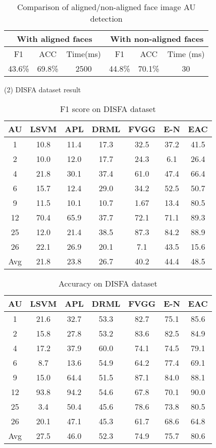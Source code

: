 \documentclass[a4paper, 10pt, conference]{ieeeconf}      %
\begin{document}
\begin{table}
\caption{Comparison of aligned/non-aligned face image AU detection}
\label{tab5}
\begin{center}

\begin{tabular}{|c|c|c|c|c|c|}
\hline
\multicolumn{3}{|c|}{With aligned faces}&\multicolumn{3}{|c|}{With non-aligned faces}\\
\hline
F1&ACC&Time(ms)&F1&ACC&Time (ms)\\
\hline
43.6\%&69.8\%&2500& 44.8\%&70.1\%&30\\
\hline
\end{tabular}
\end{center}
\end{table}

(2) DISFA dataset result

\begin{table}
\caption{F1 score on DISFA dataset}
\label{tab6}
\begin{center}
\begin{tabular}{|c|c|c|c|c|c|c|}
\hline
AU&LSVM&APL\cite{p22}&DRML\cite{p22}&FVGG&E-N&EAC\\
\hline
1&10.8&11.4&17.3&32.5&37.2&41.5\\
2&10.0&12.0&17.7&24.3&6.1&26.4\\
4&21.8&30.1&37.4&61.0&47.4&66.4\\
6&15.7&12.4&29.0&34.2&52.5&50.7\\
9&11.5&10.1&10.7&1.67&13.4&80.5\\
12&70.4&65.9&37.7&72.1&71.1&89.3\\
25&12.0&21.4&38.5&87.3&84.2&88.9\\
26&22.1&26.9&20.1&7.1&43.5&15.6\\
Avg&21.8&23.8&26.7&40.2&44.4&48.5\\
\hline
\end{tabular}
\end{center}
\end{table}

\begin{table}
\caption{Accuracy on DISFA dataset}
\label{tab7}
\begin{center}
\begin{tabular}{|c|c|c|c|c|c|c|}
\hline
AU&LSVM&APL\cite{p22}&DRML\cite{p22}&FVGG&E-N&EAC\\
\hline
1&21.6&32.7&53.3&82.7&75.1&85.6\\
2&15.8&27.8&53.2&83.6&82.5&84.9\\
4&17.2&37.9&60.0&74.1&74.5&79.1\\
6&8.7&13.6&54.9&64.2&77.4&69.1\\
9&15.0&64.4&51.5&87.1&84.0&88.1\\
12&93.8&94.2&54.6&67.8&70.1&90.0\\
25&3.4&50.4&45.6&78.6&73.8&80.5\\
26&20.1&47.1&45.3&61.7&68.6&64.8\\
Avg&27.5&46.0&52.3&74.9&75.7&80.6\\

\hline
\end{tabular}
\end{center}
\end{table}
\end{document}
